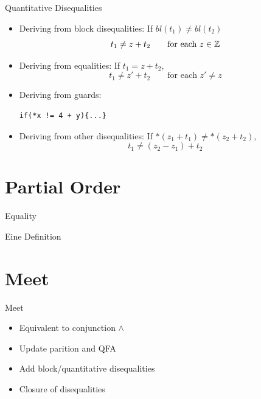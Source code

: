 \documentclass{beamer}
\begin{document}
\begin{frame}[containsverbatim]{Quantitative Disequalities}
    \begin{itemize}
        \item Deriving from block disequalities: If $bl(t_1) \neq bl(t_2)$
              \[
                  t_1\neq z+ t_2 \quad\quad \text{for each $z \in \mathbb{Z}$}
              \]
        \item Deriving from equalities: If $t_1 = z + t_2$,
              \[
                  t_1\neq z' + t_2 \quad\quad \text{for each $z' \neq z$}
              \]

        \item Deriving from guards:
              \begin{verbatim}
if(*x != 4 + y){...}
\end{verbatim}
        \item Deriving from other disequalities: If $*(z_1 + t_1) \neq *(z_2 + t_2)$,
              \[ t_1 \neq (z_2 - z_1) + t_2
              \]
    \end{itemize}
\end{frame}

\section{Partial Order}

\begin{frame}{Equality}
    \begin{Definition}
        Eine Definition
    \end{Definition}
\end{frame}

\section{Meet}
\begin{frame}{Meet}
    \begin{itemize}

        \item Equivalent to conjunction $\land$
        \item Update parition and QFA
        \item Add block/quantitative disequalities
        \item Closure of disequalities

    \end{itemize}
\end{frame}
\end{document}
